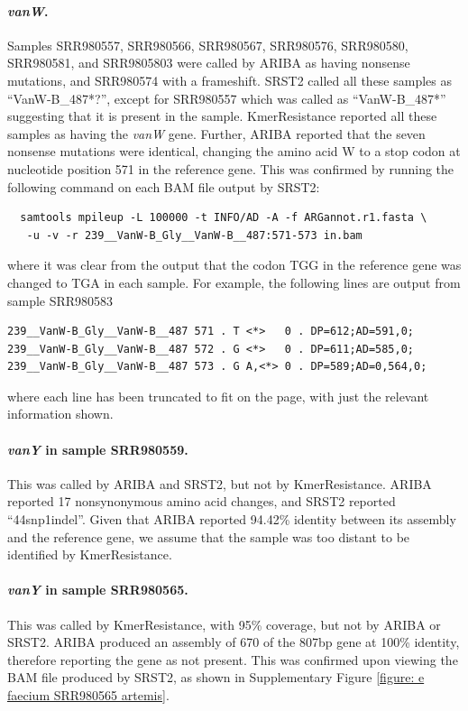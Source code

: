 \documentclass[11pt, a4paper]{article}
\begin{document}
\paragraph{\textit{vanW}.}
Samples SRR980557, SRR980566, SRR980567, SRR980576, SRR980580, SRR980581,
and SRR9805803
were called by ARIBA as having nonsense mutations, and
SRR980574 with a frameshift. SRST2 called all these samples as ``VanW-B\_487*?'',
except for  SRR980557 which was called as ``VanW-B\_487*'' suggesting that it is
present in the sample. KmerResistance reported all these samples as having
the \textit{vanW} gene. Further, ARIBA reported that
the seven nonsense mutations were identical, changing the amino acid W
to a stop codon at nucleotide position 571 in the reference gene. This
was confirmed by running the
following command on each BAM file output by SRST2:
\begin{verbatim}
  samtools mpileup -L 100000 -t INFO/AD -A -f ARGannot.r1.fasta \
   -u -v -r 239__VanW-B_Gly__VanW-B__487:571-573 in.bam
\end{verbatim}
where it was clear from the output that the codon TGG in the reference
gene was changed to TGA in each sample. For example, the following lines
are output from sample SRR980583
\begin{verbatim}
239__VanW-B_Gly__VanW-B__487 571 . T <*>   0 . DP=612;AD=591,0;
239__VanW-B_Gly__VanW-B__487 572 . G <*>   0 . DP=611;AD=585,0;
239__VanW-B_Gly__VanW-B__487 573 . G A,<*> 0 . DP=589;AD=0,564,0;
\end{verbatim}
where each line has been truncated to fit on the page, with just the relevant
information shown.




\paragraph{\textit{vanY} in sample SRR980559.}
This was called by ARIBA and SRST2, but not by KmerResistance. ARIBA reported 17
nonsynonymous amino acid changes, and SRST2 reported ``44snp1indel''. Given
that ARIBA reported 94.42\% identity between its assembly and the reference
gene, we assume that the sample was too distant to be identified by
KmerResistance.


\paragraph{\textit{vanY} in sample SRR980565.} This was called by KmerResistance,
with 95\% coverage, but
not by ARIBA or SRST2. ARIBA produced an assembly of 670 of the 807bp gene at
100\% identity, therefore reporting the gene as not present. This was
confirmed upon viewing the BAM file produced by SRST2, as shown in
Supplementary Figure \ref{figure: e faecium SRR980565 artemis}.
\end{document}
